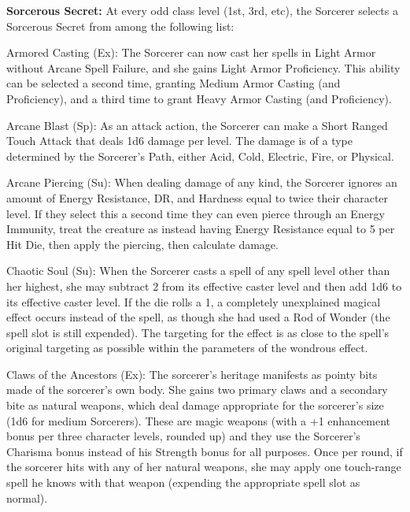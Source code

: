 \textbf{Sorcerous Secret:} At every odd class level (1st, 3rd, etc), the Sorcerer selects a Sorcerous Secret from among the following list:

\begin{description*}

\item[Armored Casting (Ex):] The Sorcerer can now cast her spells in Light Armor without Arcane Spell Failure, and she gains Light Armor Proficiency. This ability can be selected a second time, granting Medium Armor Casting (and Proficiency), and a third time to grant Heavy Armor Casting (and Proficiency).

\item[Arcane Blast (Sp):] As an attack action, the Sorcerer can make a Short Ranged Touch Attack that deals 1d6 damage per level. The damage is of a type determined by the Sorcerer's Path, either Acid, Cold, Electric, Fire, or Physical.

\item[Arcane Piercing (Su):] When dealing damage of any kind, the Sorcerer ignores an amount of Energy Resistance, DR, and Hardness equal to twice their character level. If they select this a second time they can even pierce through an Energy Immunity, treat the creature as instead having Energy Resistance equal to 5 per Hit Die, then apply the piercing, then calculate damage.

\item[Chaotic Soul (Su):] When the Sorcerer casts a spell of any spell level other than her highest, she may subtract 2 from its effective caster level and then add 1d6 to its effective caster level. If the die rolls a 1, a completely unexplained magical effect occurs instead of the spell, as though she had used a Rod of Wonder (the spell slot is still expended). The targeting for the effect is as close to the spell's original targeting as possible within the parameters of the wondrous effect.

\item[Claws of the Ancestors (Ex):] The sorcerer's heritage manifests as pointy bits made of the sorcerer's own body. She gains two primary claws and a secondary bite as natural weapons, which deal damage appropriate for the sorcerer's size (1d6 for medium Sorcerers). These are magic weapons (with a +1 enhancement bonus per three character levels, rounded up) and they use the Sorcerer's Charisma bonus instead of his Strength bonus for all purposes. Once per round, if the sorcerer hits with any of her natural weapons, she may apply one touch-range spell he knows with that weapon (expending the appropriate spell slot as normal).


\end{description*}
